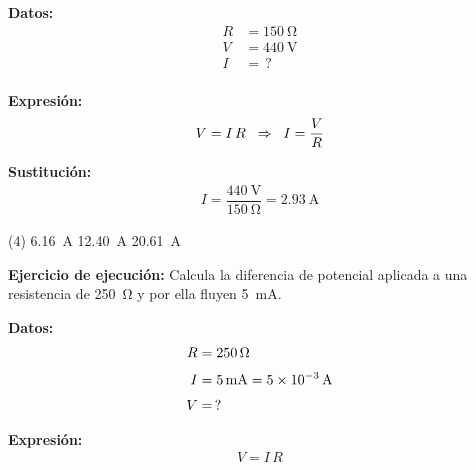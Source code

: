 \documentclass[12pt]{exam}
\begin{document}
\begin{questions}
    \vspace*{0.3cm}
    \begin{minipage}[t]{0.35\linewidth}
    \textbf{Datos:}
    \begin{align*}
    R &= \SI{150}{\ohm} \\[0.3em]
    V &= \SI{440}{\volt} \\[0.3em]
    I &= \, ? \\
    \end{align*}
    \end{minipage}
    \hspace{1cm}
    \begin{minipage}[t]{0.4\linewidth}
    \textbf{Expresión:}
    \begin{align*}
    V = I \, R \hspace{0.2cm} \Rightarrow \hspace{0.2cm} I = \dfrac{V}{R}
    \end{align*}
    \end{minipage}

    \vspace*{0.3cm}
    \textbf{Sustitución:}
    \begin{align*}
    I = \dfrac{\SI{440}{\volt}}{\SI{150}{\ohm}} = \SI{2.93}{\ampere}
    \end{align*}

    \vspace{0.3cm}
    \begin{tasks}(4)
        \task {}
        \task \SI{6.16}{\ampere}
        \task \SI{12.40}{\ampere}
        \task \SI{20.61}{\ampere}
    \end{tasks}

    \setcounter{question}{26} \question \textbf{Ejercicio de ejecución:} Calcula la diferencia de potencial aplicada a una resistencia de \SI{250}{\ohm} y por ella fluyen \SI{5}{\milli\ampere}.

    \vspace*{0.5cm}
    \begin{minipage}[t]{0.35\linewidth}
    \textbf{Datos:}
    \begin{align*}
    R &= \SI{250}{\ohm} \\[0.3em]
    I &= \SI{5}{\milli\ampere} = \SI{5d-3}{\ampere} \\[0.3em]
    V &= \, ? \\
    \end{align*}
    \end{minipage}
    \hspace{1cm}
    \begin{minipage}[t]{0.4\linewidth}
    \textbf{Expresión:}
    \begin{align*}
    V = I \, R
    \end{align*}
    \end{minipage}


\end{questions}
\end{document}
